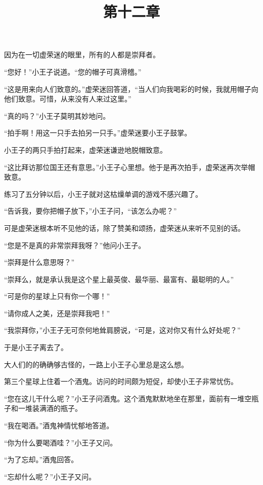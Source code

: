 因为在一切虚荣迷的眼里，所有的人都是崇拜者。

“您好！”小王子说道。“您的帽子可真滑稽。”

{\startalignment[center]
 \stopalignment}

“这是用来向人们致意的。”虚荣迷回答道，“当人们向我喝彩的时候，我就用帽子向他们致意。可惜，从来没有人来过这里。”

“真的吗？”小王子莫明其妙地问。

“拍手啊！用这一只手去拍另一只手。”虚荣迷要小王子鼓掌。

小王子的两只手拍打起来，虚荣迷谦逊地脱帽致意。

“这比拜访那位国王还有意思。”小王子心里想。他于是再次拍手，虚荣迷再次举帽致意。

练习了五分钟以后，小王子就对这枯燥单调的游戏不感兴趣了。

“告诉我，要你把帽子放下，”小王子问，“该怎么办呢？”

可是虚荣迷根本听不见他的话，除了赞美和颂扬，虚荣迷从来听不见别的话。

“您是不是真的非常崇拜我呀？”他问小王子。

“崇拜是什么意思呀？”

“崇拜么，就是承认我是这个星上最英俊、最华丽、最富有、最聪明的人。”

“可是你的星球上只有你一个哪！”

“请你成人之美，还是崇拜我吧！”

“我崇拜你，”小王子无可奈何地耸肩膀说，“可是，这对你又有什么好处呢？”

于是小王子离去了。

大人们的的确确够古怪的，一路上小王子心里总是这么想。

\title{第十二章}

{\startalignment[center]
 \stopalignment}

第三个星球上住着一个酒鬼。访问的时间颇为短促，却使小王子非常忧伤。

“您在这儿干什么呢？”小王子问酒鬼。这个酒鬼默默地坐在那里，面前有一堆空瓶子和一堆装满酒的瓶子。

“我在喝酒。”酒鬼神情忧郁地答道。

“你为什么要喝酒哇？”小王子又问。

“为了忘却。”酒鬼回答。

“忘却什么呢？”小王子又问。

